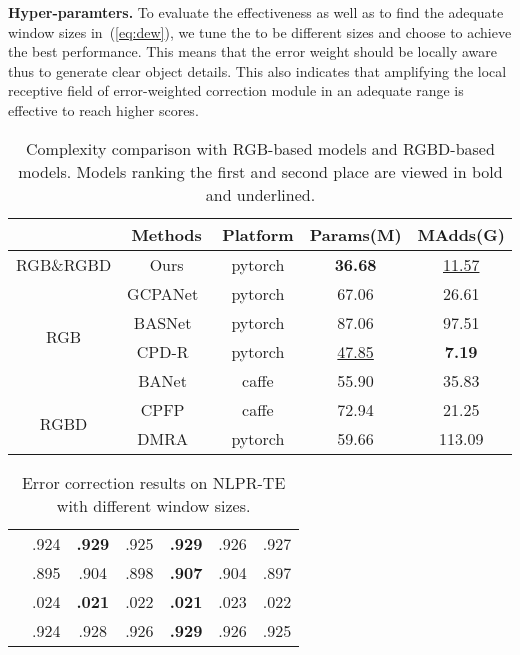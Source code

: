 \documentclass[sigconf]{acmart}
\newcommand{\equref}[1]{(\ref{#1})}
\begin{document}
\textbf{Hyper-paramters.} To evaluate the effectiveness as well as to find the adequate window sizes in~\equref{eq:dew}, we tune the  to be different sizes and choose  to achieve the best performance. This means that the error weight should be locally aware thus to generate clear object details.  
This also indicates that amplifying the local receptive field of error-weighted correction module in an adequate range is effective to reach higher scores.

\begin{table}[t]
\setlength{\tabcolsep}{1.5mm}
	\caption{Complexity comparison with RGB-based models and RGBD-based models. Models ranking the first and second place are viewed in bold and underlined.}
	\label{table:params}
	\begin{tabular}{ccccc}
		\hline
		& Methods & Platform & Params(M)      & MAdds(G)       \\ \hline
		RGB\&RGBD              & Ours    & pytorch  & \textbf{36.68} & {\underline{11.57}}   \\ \hline
		\multirow{4}{*}{RGB}  & GCPANet~\cite{chen2020global} & pytorch  & 67.06          & 26.61         \\
		& BASNet~\cite{qin2019basnet}  & pytorch  & 87.06          & 97.51         \\
		& CPD-R~\cite{wu2019cascaded}   & pytorch  & {\underline{47.85}}    & \textbf{7.19} \\
		& BANet~\cite{su2019selectivity}   & caffe    & 55.90          & 35.83         \\ \hline
		\multirow{2}{*}{RGBD} & CPFP~\cite{zhao2019contrast}    & caffe    & 72.94          & 21.25         \\
		& DMRA~\cite{piao2019depth}    & pytorch  & 59.66          & 113.09        \\ \hline
	\end{tabular}
\end{table} 


\begin{table}[t]
\setlength{\tabcolsep}{2.8mm}
	\caption{Error correction results on NLPR-TE with different window sizes.}
	\label{table:kernal size}
	\begin{tabular}{c|cccccc}
		\hline
		&  &  &  &  &  &   \\ \hline
		 &  .924   &  \textbf{.929}   &  .925   &  \textbf{.929}   &  .926  &  .927         \\   &  .895   &  .904   &  .898   &  \textbf{.907}   &  .904 &   .897          \\   &  .024   &  \textbf{.021}   &  .022   &  \textbf{.021}   &   .023  & .022  \\ &  .924   &  .928   &  .926   &  \textbf{.929}   &   .926 & .925        \\ \hline
	\end{tabular}
\end{table}
\end{document}
